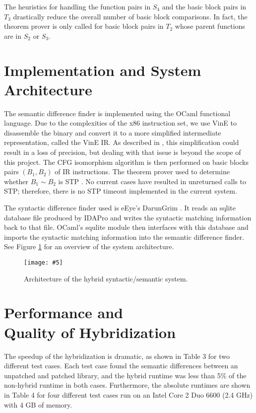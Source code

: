 \documentclass[11pt,twocolumn]{article}
\newcommand{\figinclude}[5][0]
{
  \begin{figure} [t]
  \centering
  \texttt{[image: \#5]}
  \caption{#4}
  \label{#2}
  \end{figure}
}
\begin{document}
The heuristics for handling the function pairs in $S_4$ and the basic block pairs in $T_3$ drastically reduce the overall number of basic block comparisons.  In fact, the theorem prover is only called for basic block pairs in $T_2$ whose parent functions are in $S_2$ or $S_3$.


\section{Implementation and System Architecture}

The semantic difference finder is implemented using the OCaml functional language.  Due to the complexities of the x86 instruction set, we use VinE \cite{vine} to disassemble the binary and convert it to a more simplified intermediate representation, called the VinE IR.  As described in \cite{sdibe}, this simplification could result in a loss of precision, but dealing with that issue is beyond the scope of this project.  The CFG isomorphism algorithm is then performed on basic blocks pairs $(B_1, B_2)$ of IR instructions.  The theorem prover used to determine whether $B_1 \sim B_2$ is STP \cite{stp}.  No current cases have resulted in unreturned calls to STP; therefore, there is no STP timeout implemented in the current system.

The syntactic difference finder used is eEye's DarunGrim \cite{eEye}.  It reads an sqlite database file produced by IDAPro \cite{idaPro} and writes the syntactic matching information back to that file.  
OCaml's squlite module then interfaces with this database and imports the syntactic matching information into the semantic difference finder.  See Figure \ref{sysArch} for an overview of the system architecture.

\figinclude[0]{sysArch}{3.2 in}{Architecture of the hybrid syntactic/semantic system.}{sysArch.png}


\section{Performance and \\ Quality of Hybridization}

The speedup of the hybridization is dramatic, as shown in Table 3 for two different test cases.  Each test case found the semantic differences between an unpatched and patched library, and the hybrid runtime was less than 5\% of the non-hybrid runtime in both cases.  Furthermore, the absolute runtimes are shown in Table 4 for four different test cases run on an Intel Core 2 Duo 6600 (2.4 GHz) with 4 GB of memory.
\end{document}

